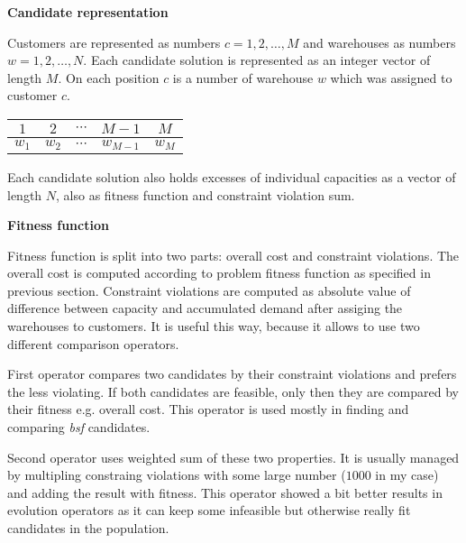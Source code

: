 \documentclass[./main.tex]{subfiles}
\begin{document}
\textbf{Candidate representation}

Customers are represented as numbers $c = 1, 2, \dots, M$ and warehouses as numbers $w = 1, 2, \dots, N$.
Each candidate solution is represented as an integer vector of length $M$.
On each position $c$ is a number of warehouse $w$ which was assigned to customer $c$.

\vspace{0.5cm}
\begin{center}
    \begin{tabular}{| c | c | c | c | c |}
        \multicolumn{1}{c}{$1$} & \multicolumn{1}{c}{$2$} & \multicolumn{1}{c}{$\cdots$} & \multicolumn{1}{c}{$M - 1$} & \multicolumn{1}{c}{$M$} \\
        \hline
        $w_1$ & $w_2$ & $\cdots$ & $w_{M-1}$ & $w_M$ \\
        \hline
    \end{tabular}
\end{center}
\vspace{0.5cm}

Each candidate solution also holds excesses of individual capacities as a vector of length $N$, also as fitness function and constraint violation sum.

\textbf{Fitness function}

Fitness function is split into two parts: overall cost and constraint violations.
The overall cost is computed according to problem fitness function as specified in previous section.
Constraint violations are computed as absolute value of difference between capacity and accumulated demand after assiging the warehouses to customers.
It is useful this way, because it allows to use two different comparison operators.

First operator compares two candidates by their constraint violations and prefers the less violating.
If both candidates are feasible, only then they are compared by their fitness e.g. overall cost.
This operator is used mostly in finding and comparing \textit{bsf} candidates.

Second operator uses weighted sum of these two properties. It is usually managed by multipling constraing violations with some large number ($1000$ in my case) and adding the result with fitness.
This operator showed a bit better results in evolution operators as it can keep some infeasible but otherwise really fit candidates in the population.
\end{document}
